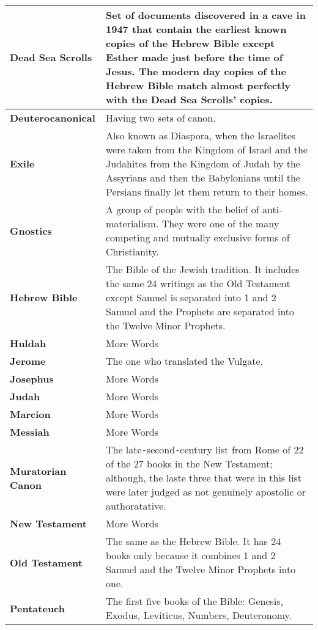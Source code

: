 \documentclass{report}
\begin{document}
\begin{center}
\begin{longtable}{| p{5cm} | p{7cm} |}
            \textbf{Dead Sea Scrolls} & Set of documents discovered in a cave in 1947 that contain the earliest known copies of the Hebrew Bible except Esther made just before the time of Jesus. The modern day copies of the Hebrew Bible match almost perfectly with the Dead Sea Scrolls' copies.\\ \hline
            \textbf{Deuterocanonical} & Having two sets of canon.\\ \hline
            \textbf{Exile} & Also known as Diaspora, when the Israelites were taken from the Kingdom of Israel and the Judahites from the Kingdom of Judah by the Assyrians and then the Babylonians until the Persians finally let them return to their homes.\\ \hline
            \textbf{Gnostics} & A group of people with the belief of anti-materialism. They were one of the many competing and mutually exclusive forms of Christianity.\\ \hline
            \textbf{Hebrew Bible} & The Bible of the Jewish tradition. It includes the same 24 writings as the Old Testament except Samuel is separated into 1 and 2 Samuel and the Prophets are separated into the Twelve Minor Prophets.\\ \hline
            \textbf{Huldah} & More Words \\ \hline
            \textbf{Jerome} & The one who translated the Vulgate.\\ \hline
            \textbf{Josephus} & More Words \\ \hline
            \textbf{Judah} & More Words \\ \hline
            \textbf{Marcion} & More Words \\ \hline
            \textbf{Messiah} & More Words \\ \hline
            \textbf{Muratorian Canon} & The late\texttt{-}second\texttt{-}century list from Rome of 22 of the 27 books in the New Testament; although, the laste three that were in this list were later judged as not genuinely apostolic or authoratative.\\ \hline
            \textbf{New Testament} & More Words \\ \hline
            \textbf{Old Testament} & The same as the Hebrew Bible. It has 24 books only because it combines 1 and 2 Samuel and the Twelve Minor Prophets into one.\\ \hline
            \textbf{Pentateuch} & The first five books of the Bible: Genesis, Exodus, Leviticus, Numbers, Deuteronomy.\\ \hline

\end{longtable}
\end{center}
\end{document}
